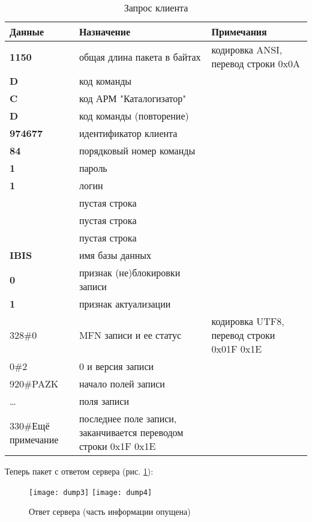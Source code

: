 \begin{table}[htbp]
	\centering
	\caption{Запрос клиента}
	\begin{tabular}{ | p{} | p{} | p{} | }
		\hline
		\textbf{Данные} & 
		\textbf{Назначение} &
		\textbf{Примечания}
		\\ \hline
		\hline
		\textbf{1150} &
		общая длина пакета в байтах &
		кодировка ANSI, перевод строки 0x0A		
		\\ \hline
		\textbf{D} &
		код команды &
		\\ \hline
		\textbf{C} &
		код АРМ "Каталогизатор" &
		\\ \hline
		\textbf{D} &
		код команды (повторение) &
		\\ \hline
		\textbf{974677} &
		идентификатор клиента &
		\\ \hline
		\textbf{84} &
		порядковый номер команды &
		\\ \hline
		\textbf{1} &
		пароль &
		\\ \hline
		\textbf{1} &
		логин &
		\\ \hline
		& пустая строка &
		\\ \hline
		& пустая строка &
		\\ \hline
		& пустая строка &
		\\ \hline
		\textbf{IBIS} &
		имя базы данных &
		\\ \hline
		\textbf{0} &
		признак (не)блокировки записи &
		\\ \hline
		\textbf{1} &
		признак актуализации &
		\\ \hline
		328\#0 &
		MFN записи и ее статус &
		кодировка UTF8, перевод строки 0x01F 0x1E
		\\ \hline
		0\#2 &
		0 и версия записи &
		\\ \hline
		920\#PAZK &
		начало полей записи &
		\\ \hline
		\dots &
		поля записи &
		\\ \hline
		330\#Ещё примечание &
		последнее поле записи, заканчивается переводом строки 0x1F 0x1E &
		\\ \hline
	\end{tabular}
\end{table}

Теперь пакет с ответом сервера (рис. \ref{dump3}):

\begin{figure}[h]	
	\centering
	\texttt{[image: dump3]}
	\texttt{[image: dump4]}
	\caption{Ответ сервера (часть информации опущена)} \label{dump3}
\end{figure}

